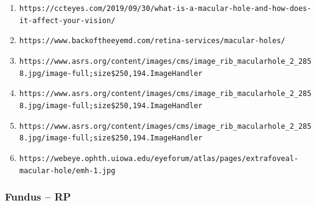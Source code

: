 \documentclass{article}
\begin{document}
\begin{enumerate}
			\item \nolinkurl{https://ccteyes.com/2019/09/30/what-is-a-macular-hole-and-how-does-it-affect-your-vision/}
			
			\item \nolinkurl{https://www.backoftheeyemd.com/retina-services/macular-holes/}
			
			\item \nolinkurl{https://www.asrs.org/content/images/cms/image_rib_macularhole_2_2858.jpg/image-full;size$250,194.ImageHandler}
			
			\item \nolinkurl{https://www.asrs.org/content/images/cms/image_rib_macularhole_2_2858.jpg/image-full;size$250,194.ImageHandler}
			
			\item \nolinkurl{https://www.asrs.org/content/images/cms/image_rib_macularhole_2_2858.jpg/image-full;size$250,194.ImageHandler}
			
			\item \nolinkurl{https://webeye.ophth.uiowa.edu/eyeforum/atlas/pages/extrafoveal-macular-hole/emh-1.jpg}
	\end{enumerate}
	
	\subsubsection*{Fundus -- RP}
	\vspace{0.5cm}
		
\end{document}

